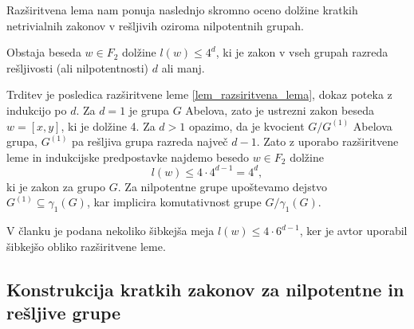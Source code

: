     Razširitvena lema nam ponuja naslednjo skromno oceno dolžine kratkih netrivialnih zakonov v rešljivih oziroma nilpotentnih grupah.

    \begin{trditev}
    \label{trd_ocitna_meja_za_kratke_zakone_resljive_grupe}
     Obstaja beseda $w \in F_2$ dolžine $l(w) \le 4^{d}$, ki je zakon v vseh grupah razreda rešljivosti (ali nilpotentnosti) $d$ ali manj.  
    \end{trditev}
    \begin{dokaz}
        Trditev je posledica razširitvene leme \ref{lem_razsiritvena_lema}, dokaz poteka z indukcijo po $d$. Za $d = 1$ je grupa $G$ Abelova, zato je ustrezni zakon beseda $w = [x,y]$, ki je dolžine 4.
        Za $d > 1$ opazimo, da je kvocient $G / G^{(1)}$ Abelova grupa, $G^{(1)}$ pa rešljiva grupa razreda največ $d - 1$. Zato z uporabo razširitvene leme in indukcijske predpostavke najdemo besedo $w \in  F_2$ dolžine \begin{equation*}
            l(w) \le  4 \cdot 4^{d - 1} = 4^{d},
        \end{equation*}  
        ki je zakon za grupo $G$. Za nilpotentne grupe upoštevamo dejstvo $G^{(1)} \subseteq \gamma_1(G)$, kar implicira komutativnost grupe $G / \gamma_1(G)$. 
    \end{dokaz}
    
    \begin{opomba}
    V članku \cite[str.~8]{Kozma_Thom_2016} je podana nekoliko šibkejša meja $l(w) \le  4 \cdot 6^{d-1}$, ker je avtor uporabil šibkejšo obliko razširitvene leme.
    \end{opomba}

\subsection{Konstrukcija kratkih zakonov za nilpotentne in rešljive grupe}

